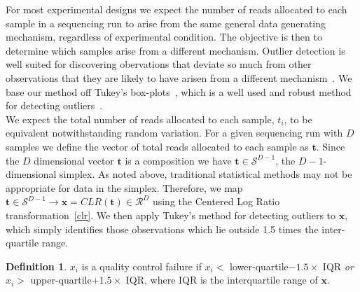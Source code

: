 \documentclass{article}\usepackage[]{graphicx}\usepackage[]{color}
\theoremstyle{definition}
\newtheorem{definition}{Definition}
\begin{document}
For most experimental designs we expect the number of reads allocated to each sample in a sequencing run to arise from the same general data generating mechanism, regardless of experimental condition.  The objective is then to determine which samples arise from a different mechanism.  Outlier detection is well suited for discovering obervations that deviate so much from other observations that they are likely to have arisen from a different mechanism~\cite{Hawkins1980}.  We base our method off Tukey's box-plots~\cite{Tukey1977}, which is a well used and robust method for detecting outliers~\cite{Ben-Gal2009}.\\

We expect the total number of reads allocated to each sample, $t_i$, to be equivalent notwithstanding random variation. For a given sequencing run with $D$ samples we define the vector of total reads allocated to each sample as $\mathbf{t}$.  Since the $D$ dimensional vector $\mathbf{t}$ is a composition we have $\mathbf{t} \in \mathcal{S}^{D-1}$, the $D-1$-dimensional simplex. As noted above, traditional statistical methods may not be appropriate for data in the simplex.  Therefore, we map $\mathbf{t} \in \mathcal{S}^{D-1} \rightarrow \mathbf{x} = CLR(\mathbf{t}) \in \mathcal{R}^D$ using the Centered Log Ratio transformation~\ref{clr}.  We then apply Tukey's method for detecting outliers to $\mathbf{x}$, which simply identifies those observations which lie outside 1.5 times the inter-quartile range.

\theoremstyle{definition}
\begin{definition}
$x_i$ is a quality control failure if $x_i <$ lower-quartile$- 1.5 \times$ IQR \emph{or}  $x_i >$ upper-quartile$+ 1.5 \times$ IQR, where IQR is the interquartile range of $\mathbf{x}$.
\end{definition}
\end{document}
